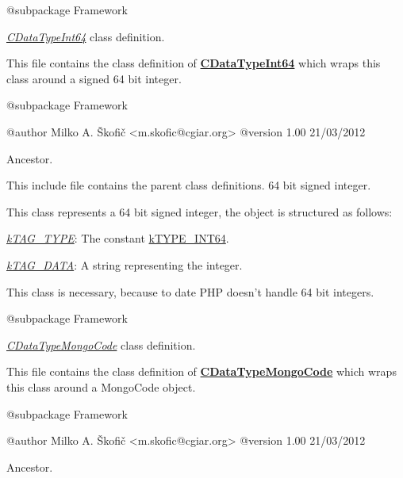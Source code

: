 \begin{DoxyVerb}    @subpackage     Framework\end{DoxyVerb}


{\itshape \hyperlink{class_c_data_type_int64}{C\-Data\-Type\-Int64}} class definition.

This file contains the class definition of {\bfseries \hyperlink{class_c_data_type_int64}{C\-Data\-Type\-Int64}} which wraps this class around a signed 64 bit integer.

\begin{DoxyVerb}    @subpackage     Framework

    @author         Milko A. Škofič <m.skofic@cgiar.org>
    @version        1.00 21/03/2012\end{DoxyVerb}


Ancestor.

This include file contains the parent class definitions. 64 bit signed integer.

This class represents a 64 bit signed integer, the object is structured as follows\-:


\begin{DoxyItemize}
\item {\itshape \hyperlink{}{k\-T\-A\-G\-\_\-\-T\-Y\-P\-E}}\-: The constant \hyperlink{}{k\-T\-Y\-P\-E\-\_\-\-I\-N\-T64}. 
\item {\itshape \hyperlink{}{k\-T\-A\-G\-\_\-\-D\-A\-T\-A}}\-: A string representing the integer. 
\end{DoxyItemize}

This class is necessary, because to date P\-H\-P doesn't handle 64 bit integers.

\begin{DoxyVerb}    @subpackage     Framework\end{DoxyVerb}


{\itshape \hyperlink{class_c_data_type_mongo_code}{C\-Data\-Type\-Mongo\-Code}} class definition.

This file contains the class definition of {\bfseries \hyperlink{class_c_data_type_mongo_code}{C\-Data\-Type\-Mongo\-Code}} which wraps this class around a Mongo\-Code object.

\begin{DoxyVerb}    @subpackage     Framework

    @author         Milko A. Škofič <m.skofic@cgiar.org>
    @version        1.00 21/03/2012\end{DoxyVerb}


Ancestor.

